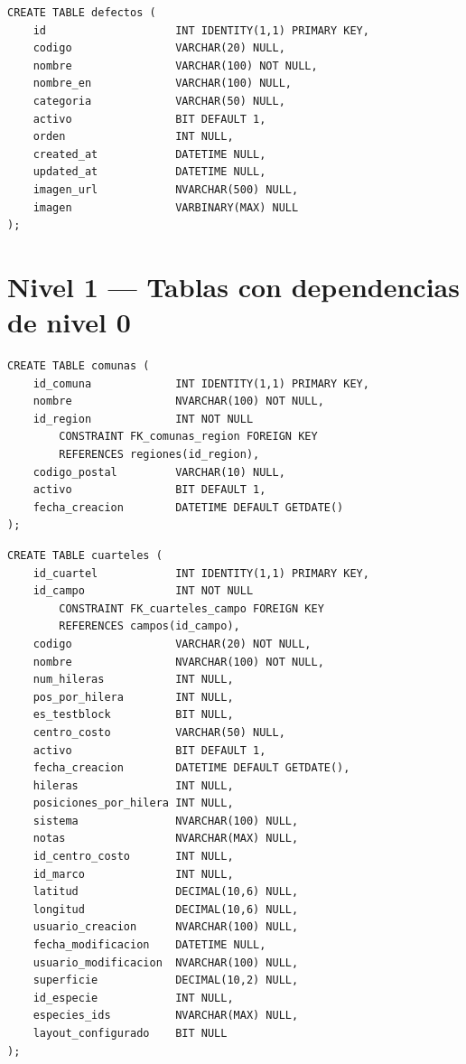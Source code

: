 \documentclass[12pt,a4paper,twoside]{report}
\begin{document}
\begin{lstlisting}[style=sqlstyle, caption={defectos}]
CREATE TABLE defectos (
    id                    INT IDENTITY(1,1) PRIMARY KEY,
    codigo                VARCHAR(20) NULL,
    nombre                VARCHAR(100) NOT NULL,
    nombre_en             VARCHAR(100) NULL,
    categoria             VARCHAR(50) NULL,
    activo                BIT DEFAULT 1,
    orden                 INT NULL,
    created_at            DATETIME NULL,
    updated_at            DATETIME NULL,
    imagen_url            NVARCHAR(500) NULL,
    imagen                VARBINARY(MAX) NULL
);
\end{lstlisting}

\section{Nivel 1 --- Tablas con dependencias de nivel 0}

\begin{lstlisting}[style=sqlstyle, caption={comunas}]
CREATE TABLE comunas (
    id_comuna             INT IDENTITY(1,1) PRIMARY KEY,
    nombre                NVARCHAR(100) NOT NULL,
    id_region             INT NOT NULL
        CONSTRAINT FK_comunas_region FOREIGN KEY
        REFERENCES regiones(id_region),
    codigo_postal         VARCHAR(10) NULL,
    activo                BIT DEFAULT 1,
    fecha_creacion        DATETIME DEFAULT GETDATE()
);
\end{lstlisting}

\begin{lstlisting}[style=sqlstyle, caption={cuarteles}]
CREATE TABLE cuarteles (
    id_cuartel            INT IDENTITY(1,1) PRIMARY KEY,
    id_campo              INT NOT NULL
        CONSTRAINT FK_cuarteles_campo FOREIGN KEY
        REFERENCES campos(id_campo),
    codigo                VARCHAR(20) NOT NULL,
    nombre                NVARCHAR(100) NOT NULL,
    num_hileras           INT NULL,
    pos_por_hilera        INT NULL,
    es_testblock          BIT NULL,
    centro_costo          VARCHAR(50) NULL,
    activo                BIT DEFAULT 1,
    fecha_creacion        DATETIME DEFAULT GETDATE(),
    hileras               INT NULL,
    posiciones_por_hilera INT NULL,
    sistema               NVARCHAR(100) NULL,
    notas                 NVARCHAR(MAX) NULL,
    id_centro_costo       INT NULL,
    id_marco              INT NULL,
    latitud               DECIMAL(10,6) NULL,
    longitud              DECIMAL(10,6) NULL,
    usuario_creacion      NVARCHAR(100) NULL,
    fecha_modificacion    DATETIME NULL,
    usuario_modificacion  NVARCHAR(100) NULL,
    superficie            DECIMAL(10,2) NULL,
    id_especie            INT NULL,
    especies_ids          NVARCHAR(MAX) NULL,
    layout_configurado    BIT NULL
);
\end{lstlisting}
\end{document}
